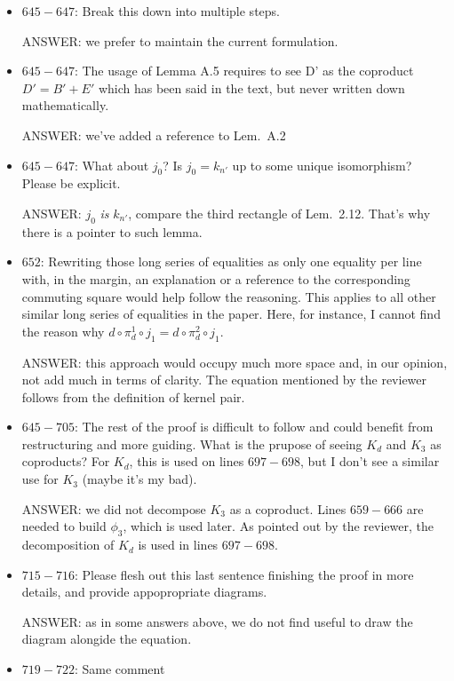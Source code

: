 \documentclass[english,11pt,a4paper]{article}
\begin{document}
\begin{itemize}
\item $645-647$: Break this down into multiple steps.

ANSWER: we prefer to maintain the current formulation.


\item $645-647$: The usage of Lemma A.5 requires to see D' as the coproduct $D' = B' + E'$ which has been said in the text, but never written down mathematically.

ANSWER: we've added a reference to Lem.~A.2

\item $645-647$: What about $j_0$? Is $j_0 = k_{n'}$ up to some unique isomorphism? Please be explicit.

ANSWER: $j_0$ \emph{is} $k_{n'}$, compare the third rectangle of Lem.~2.12. That's why there is a pointer to such lemma.

\item $652$: Rewriting those long series of equalities as only one equality per line with, in the margin, an explanation or a reference to the corresponding commuting square would help follow the reasoning. This applies to all other similar long series of equalities in the paper. Here, for instance, I cannot find the reason why $d \circ \pi^1_d \circ j_1 = d \circ \pi^2_d \circ j_1$.

ANSWER: this approach would occupy much more space and, in our opinion, not add much in terms of clarity. The equation mentioned by the reviewer follows from the definition of kernel pair. 


\item $645-705$: The rest of the proof is difficult to follow and could benefit from restructuring and more guiding. What is the prupose of seeing $K_d$ and $K_3$ as coproducts? For $K_d$, this is used on lines $697-698$, but I don't see a similar use for $K_3$ (maybe it's my bad).

ANSWER: we did not decompose $K_3$ as a coproduct. Lines $659-666$ are needed to build $\phi_3$, which is used later. As pointed out by the reviewer, the decomposition of $K_d$ is used in lines $697-698$.

\item $715-716$: Please flesh out this last sentence finishing the proof in more details, and provide appopropriate diagrams.

ANSWER: as in some answers above, we do not find useful to draw the diagram alongide the equation.


\item $719-722$: Same comment


\end{itemize}
\end{document}
